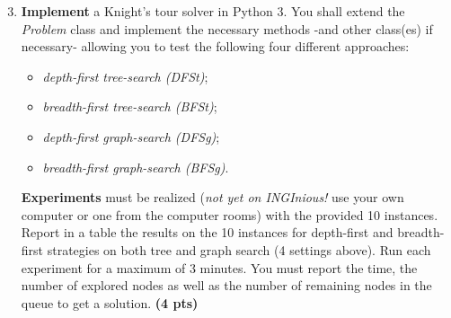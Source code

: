 \documentclass[11pt,a4paper]{report}
\begin{document}
\begin{answers}[4cm]
\end{answers}



\begin{enumerate}
\setcounter{enumi}{2}
    \item \textbf{Implement} a Knight's tour solver in Python 3.
			You shall extend the \emph{Problem} class and implement the necessary methods -and other class(es) if necessary- allowing you to test the following four different approaches: 
			\begin{itemize}
			\item \textit{depth-first tree-search (DFSt)};
			\item \textit{breadth-first tree-search (BFSt)};
			\item \textit{depth-first graph-search (DFSg)};
			\item \textit{breadth-first graph-search (BFSg)}. 
			\end{itemize}

    \textbf{Experiments} must be realized (\textit{not yet on INGInious!} use your own computer or one from the computer rooms) with the provided 10 instances. Report in a table the results on the 10 instances for depth-first and breadth-first strategies on both tree and graph search (4 settings above). Run each experiment for a maximum of 3 minutes. You must report the time, the number of explored nodes as well as the number of remaining nodes in the queue to get a solution. \textbf{(4 pts)}
\end{enumerate}
\end{document}
